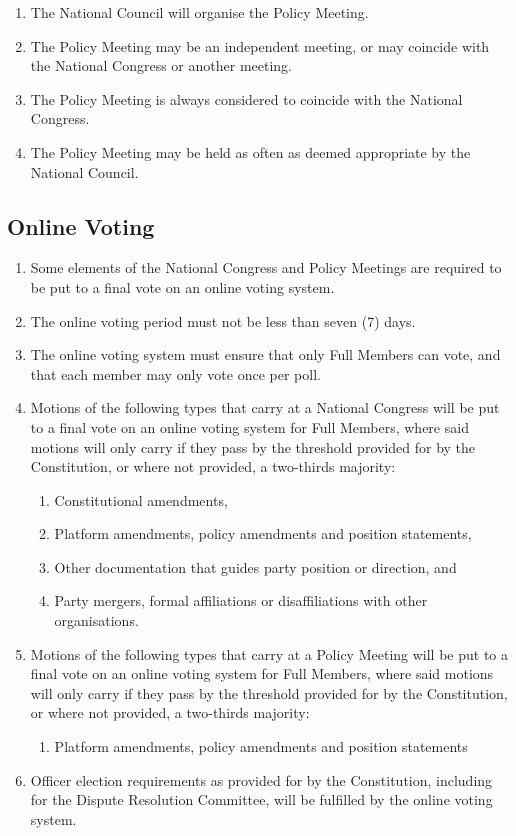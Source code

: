 \documentclass[a4paper,titlepage,8.5pt]{article}
\begin{document}
\begin{enumerate}
\item The National Council will organise the Policy Meeting.
\item The Policy Meeting may be an independent meeting, or may coincide with the National Congress or another meeting.
\item The Policy Meeting is always considered to coincide with the National Congress.
\item The Policy Meeting may be held as often as deemed appropriate by the National Council.
\end{enumerate}

\subsection{Online Voting}

\begin{enumerate}
\item Some elements of the National Congress and Policy Meetings are required to be put to a final vote on an online voting system.
\item The online voting period must not be less than seven (7) days.
\item The online voting system must ensure that only Full Members can vote, and that each member may only vote once per poll.
\item Motions of the following types that carry at a National Congress will be put to a final vote on an online voting system for Full Members, where said motions will only carry if they pass by the threshold provided for by the Constitution, or where not provided, a two-thirds majority:
\begin{enumerate}
\item Constitutional amendments,
\item Platform amendments, policy amendments and position statements,
\item Other documentation that guides party position or direction, and
\item Party mergers, formal affiliations or disaffiliations with other organisations.
\end{enumerate}
\item Motions of the following types that carry at a Policy Meeting will be put to a final vote on an online voting system for Full Members, where said motions will only carry if they pass by the threshold provided for by the Constitution, or where not provided, a two-thirds majority:
\begin{enumerate}
\item Platform amendments, policy amendments and position statements
\end{enumerate}
\item Officer election requirements as provided for by the Constitution, including for the Dispute Resolution Committee, will be fulfilled by the online voting system.
\end{enumerate}
\end{document}
